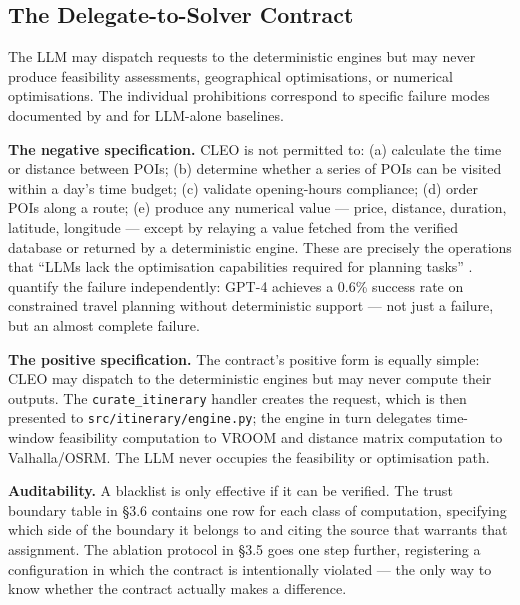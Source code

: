 \subsection{The Delegate-to-Solver Contract}

The LLM may dispatch requests to the deterministic engines but may never produce feasibility
assessments, geographical optimisations, or numerical optimisations. The individual
prohibitions correspond to specific failure modes documented by \citeauthor{itinera_tang_2024}
and \citeauthor{travelplanner} for LLM-alone baselines.

\textbf{The negative specification.} CLEO is not permitted to: (a) calculate the time or distance
between POIs; (b) determine whether a series of POIs can be visited within a day's time budget;
(c) validate opening-hours compliance; (d) order POIs along a route; (e) produce any numerical
value — price, distance, duration, latitude, longitude — except by relaying a value fetched from
the verified database or returned by a deterministic engine. These are precisely the operations
that ``LLMs lack the optimisation capabilities required for planning tasks''
\cite[§1, p.~1]{itinera_tang_2024}. \citeauthor{travelplanner} quantify the failure independently:
GPT-4 achieves a 0.6\% success rate on constrained travel planning without deterministic
support \cite{travelplanner} — not just a failure, but an almost complete failure.

\textbf{The positive specification.} The contract's positive form is equally simple: CLEO may
dispatch to the deterministic engines but may never compute their outputs. The
\texttt{curate\_itinerary} handler creates the request, which is then presented to
\texttt{src/itinerary/engine.py}; the engine in turn delegates time-window feasibility computation
to VROOM and distance matrix computation to Valhalla/OSRM. The LLM never occupies the
feasibility or optimisation path.

\textbf{Auditability.} A blacklist is only effective if it can be verified. The trust boundary table in
§3.6 contains one row for each class of computation, specifying which side of the boundary it
belongs to and citing the source that warrants that assignment. The ablation protocol in §3.5
goes one step further, registering a configuration in which the contract is intentionally violated —
the only way to know whether the contract actually makes a difference.
